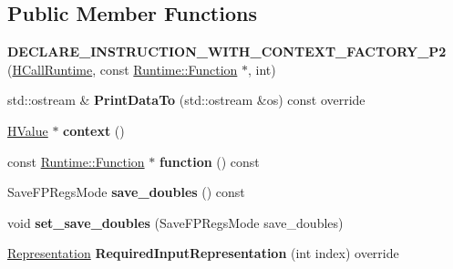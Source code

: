 \subsection*{Public Member Functions}
\begin{DoxyCompactItemize}
\item 
{\bfseries D\+E\+C\+L\+A\+R\+E\+\_\+\+I\+N\+S\+T\+R\+U\+C\+T\+I\+O\+N\+\_\+\+W\+I\+T\+H\+\_\+\+C\+O\+N\+T\+E\+X\+T\+\_\+\+F\+A\+C\+T\+O\+R\+Y\+\_\+\+P2} (\hyperlink{classv8_1_1internal_1_1_h_call_runtime}{H\+Call\+Runtime}, const \hyperlink{structv8_1_1internal_1_1_runtime_1_1_function}{Runtime\+::\+Function} $\ast$, int)\hypertarget{classv8_1_1internal_1_1_h_call_runtime_a98c7bcfd12b208c0ad476fa85150e00a}{}\label{classv8_1_1internal_1_1_h_call_runtime_a98c7bcfd12b208c0ad476fa85150e00a}

\item 
std\+::ostream \& {\bfseries Print\+Data\+To} (std\+::ostream \&os) const  override\hypertarget{classv8_1_1internal_1_1_h_call_runtime_a08fc02184b31e364e9d7fdb724b94148}{}\label{classv8_1_1internal_1_1_h_call_runtime_a08fc02184b31e364e9d7fdb724b94148}

\item 
\hyperlink{classv8_1_1internal_1_1_h_value}{H\+Value} $\ast$ {\bfseries context} ()\hypertarget{classv8_1_1internal_1_1_h_call_runtime_abf1c3ada58add273fd77f6c0a7471569}{}\label{classv8_1_1internal_1_1_h_call_runtime_abf1c3ada58add273fd77f6c0a7471569}

\item 
const \hyperlink{structv8_1_1internal_1_1_runtime_1_1_function}{Runtime\+::\+Function} $\ast$ {\bfseries function} () const \hypertarget{classv8_1_1internal_1_1_h_call_runtime_a10c054b9df39dfa995f7b429d8738d28}{}\label{classv8_1_1internal_1_1_h_call_runtime_a10c054b9df39dfa995f7b429d8738d28}

\item 
Save\+F\+P\+Regs\+Mode {\bfseries save\+\_\+doubles} () const \hypertarget{classv8_1_1internal_1_1_h_call_runtime_a2737f99a374e5a51c2c429b1a2774ff1}{}\label{classv8_1_1internal_1_1_h_call_runtime_a2737f99a374e5a51c2c429b1a2774ff1}

\item 
void {\bfseries set\+\_\+save\+\_\+doubles} (Save\+F\+P\+Regs\+Mode save\+\_\+doubles)\hypertarget{classv8_1_1internal_1_1_h_call_runtime_adaf14ef8e9a9403621ef682b47c51e68}{}\label{classv8_1_1internal_1_1_h_call_runtime_adaf14ef8e9a9403621ef682b47c51e68}

\item 
\hyperlink{classv8_1_1internal_1_1_representation}{Representation} {\bfseries Required\+Input\+Representation} (int index) override\hypertarget{classv8_1_1internal_1_1_h_call_runtime_a9e3dac39cac36876833dfb20e1f994f8}{}\label{classv8_1_1internal_1_1_h_call_runtime_a9e3dac39cac36876833dfb20e1f994f8}

\end{DoxyCompactItemize}
